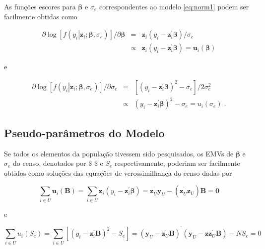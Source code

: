 \documentclass[]{book}
\begin{document}
As funções escores para \(\mathbf{\beta}\) e \(\sigma _{e}\)
correspondentes ao modelo \eqref{eq:norm1} podem ser facilmente obtidas
como

\begin{eqnarray}
\partial \log \left[ f\left( \left. y_{i}\right| \mathbf{z}_{i};\mathbf{
\beta },\sigma _{e}\right) \right] /\partial \mathbf{\beta } &=&\mathbf{z}
_{i}\left( y_{i}-\mathbf{z}_{i}^{\prime }\mathbf{\beta }\right) /\sigma _{e}
\label{eq:norm2} \\
&\propto &\mathbf{z}_{i}\left( y_{i}-\mathbf{z}_{i}^{\prime }\mathbf{
\beta }\right) =\mathbf{u}_{i}\left( \mathbf{\beta }\right)  \nonumber
\end{eqnarray}

e

\begin{eqnarray*}
\partial \log \left[ f\left( \left. y_{i}\right| \mathbf{z}_{i};\mathbf{
\beta },\sigma _{e}\right) \right] /\partial \sigma _{e} &=&\left[ \left(
y_{i}-\mathbf{z}_{i}^{\prime }\mathbf{\beta }\right) ^{2}-\sigma _{e}\right]
/2\sigma _{e}^{2}  \label{eq:norm3} \\
&\propto &\left( y_{i}-\mathbf{z}_{i}^{\prime }\mathbf{\beta }\right)
^{2}-\sigma _{e}=u_{i}\left( \sigma _{e}\right) \;.  
\end{eqnarray*}

\subsection{Pseudo-parâmetros do
Modelo}\label{pseudo-parametros-do-modelo}

Se todos os elementos da população tivessem sido pesquisados, os EMVs de
\(\mathbf{\beta }\) e \(\sigma _{e}\) do censo, denotados por
\$ \$ e \(S_{e}\) respectivamente, poderiam ser facilmente
obtidos como soluções das equações de verossimilhança do censo dadas por

\begin{equation}
\sum\limits_{i\in U}\mathbf{u}_{i}\left( \mathbf{B}\right)
=\sum\limits_{i\in U}\mathbf{z}_{i}\left( y_{i}-\mathbf{z}_{i}^{\prime }%
\mathbf{\beta }\right) =\mathbf{z}_{U}^{^{\prime }}\mathbf{y}_{U}-\left( 
\mathbf{z}_{U}^{^{\prime }}\mathbf{z}_{U}\right) \mathbf{B}=\mathbf{0}
\label{eq:norm4}
\end{equation}

e

\begin{equation}
\sum\limits_{i\in U}u_{i}\left( S_{e}\right) =\sum\limits_{i\in U}\left[
\left( y_{i}-\mathbf{z}_{i}^{\prime }\mathbf{B}\right) ^{2}-S_{e}\right]
=\left( \mathbf{y}_{U}-\mathbf{z}_{U}^{\prime }\mathbf{B}\right) ^{^{\prime
}}\left( \mathbf{y}_{U}-\mathbf{zz}_{U}^{\prime }\mathbf{B}\right) -NS_{e}=0
\label{eq:norm5}
\end{equation}
\end{document}
